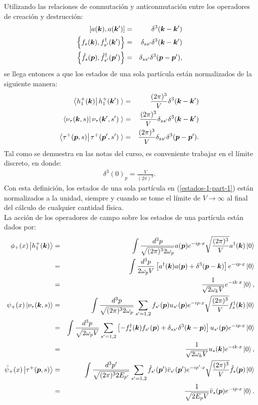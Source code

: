 Utilizando las relaciones de conmutación y anticonmutación entre los operadores de creación y destrucción:
\begin{eqnarray*}
\left[a(\boldsymbol{k}),a(\boldsymbol{k}')\right]&=&\delta^3(\boldsymbol{k}-\boldsymbol{k}') \\
\left\{f_s(\boldsymbol{k}),f_{s'}^\dagger(\boldsymbol{k}')\right\}&=&\delta_{ss'}\delta^3(\boldsymbol{k}-\boldsymbol{k}') \\
\left\{\hat{f}_s(\boldsymbol{p}),\hat{f}_{s'}^\dagger(\boldsymbol{p}')\right\}&=&\delta_{ss'}\delta^3(\boldsymbol{p}-\boldsymbol{p}'),
\end{eqnarray*}
se llega entonces a que los estados de una sola partícula están normalizados de la siguiente manera:
\begin{eqnarray*}
\left<h_1^+(\boldsymbol{k})\right|h_1^+(\boldsymbol{k}')\left.\right>&=&\frac{(2\pi)^3}{V}\delta^3(\boldsymbol{k}-\boldsymbol{k}')\\
\left<\nu_\tau(\boldsymbol{k},s)\right|\nu_\tau(\boldsymbol{k}',s')\left.\right>&=&\frac{(2\pi)^3}{V}\delta_{ss'}\delta^3(\boldsymbol{k}-\boldsymbol{k}')\\
\left<\tau^+(\boldsymbol{p},s)\right|\tau^+(\boldsymbol{p}',s')\left.\right>&=&\frac{(2\pi)^3}{V}\delta_{ss'}\delta^3(\boldsymbol{p}-\boldsymbol{p}').
\end{eqnarray*}
Tal como se demuestra en las notas del curso, es conveniente trabajar en el límite discreto, en donde:
\begin{eqnarray*}
\delta^3(0)_p=\frac{V}{(2\pi)^3}.
\end{eqnarray*}
Con esta definición, los estados de una sola partícula en (\ref{estados-1-part-1}) están normalizados a la unidad, siempre y
cuando se tome el límite de $V\rightarrow \infty$ al final del cálculo de cualquier cantidad física.\\
La acción de los operadores de campo sobre los estados de una partícula están dados por:
\begin{eqnarray}\label{accion-operadores-campos-1}
\phi_+(x)\left|h_1^+(\boldsymbol{k})\right\rangle&=&\int\frac{d^3p}{\sqrt{(2\pi)^32\omega_p}}a(\boldsymbol{p})e^{-ip\cdot
x}\sqrt{\frac{(2\pi)^3}{V}}a^\dagger(\boldsymbol{k})\left|0\right\rangle \nonumber \\
&=&\int\frac{d^3p}{2\omega_pV}\left[a^\dagger(\boldsymbol{k})a(\boldsymbol{p})+\delta^3(\boldsymbol{p}-\boldsymbol{k})\right]e^{-ip\cdot x}\left|0\right\rangle \nonumber \\
&=&\frac{1}{\sqrt{2\omega_kV}}e^{-ik\cdot x}\left|0\right\rangle, \nonumber \\
\psi_+(x)\left|\nu_\tau(\boldsymbol{k},s)\right\rangle&=&\int\frac{d^3p}{\sqrt{(2\pi)^32\omega_p}}\sum_{s'=1,2}f_{s'}(\boldsymbol{p})u_{s'}(\boldsymbol{p})e^{
-ip\cdot x}\sqrt{\frac{(2\pi)^3}{V}}f_s^\dagger(\boldsymbol{k})\left|0\right\rangle \nonumber \\
&=&\int\frac{d^3p}{\sqrt{2\omega_pV}}\sum_{s'=1,2}\left[-f_s^\dagger(\boldsymbol{k})f_{s'}(\boldsymbol{p})+\delta_{ss'}\delta^3(\boldsymbol{k}-\boldsymbol{p}
)\right ] u_{s'}(\boldsymbol{p})e^{-ip\cdot x}\left|0\right\rangle \nonumber \\
&=&\frac{1}{\sqrt{2\omega_kV}}u_s(\boldsymbol{k})e^{-ik\cdot x}\left|0\right\rangle,\nonumber \\
\Bar{\psi}_+(x)\left|\tau^+(\boldsymbol{p},s)\right\rangle&=&\int\frac{d^3p'}{\sqrt{(2\pi)^32E_{p'}}}\sum_{s'=1,2}\hat{f}_{s'}(\boldsymbol{p}')\Bar{v}_{s'}
(\boldsymbol{ p}')e^{-ip'\cdot x}\sqrt{\frac{(2\pi)^3}{V}}\Hat{f}_s(\boldsymbol{p})\left|0\right\rangle\nonumber \\
&=&\frac{1}{\sqrt{2E_pV}}\Bar{v}_s(\boldsymbol{p})e^{-ip\cdot x}\left|0\right\rangle.
\end{eqnarray}
